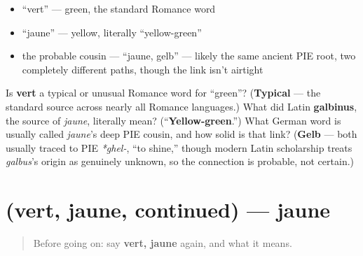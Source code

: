 \begin{itemize}
\raggedright
  \item \textquotedblleft{}vert\textquotedblright{} — green, the standard Romance word
  \item \textquotedblleft{}jaune\textquotedblright{} — yellow, literally \textquotedblleft{}yellow-green\textquotedblright{}
  \item the probable cousin — \textquotedblleft{}jaune, gelb\textquotedblright{} — likely the same ancient PIE root, two completely different paths, though the link isn't airtight
\end{itemize}

\begin{tcolorbox}[breakable,colback=teal!4,colframe=teal!35!black,title={Before you move on}]
Is \textbf{vert} a typical or unusual Romance word for \textquotedblleft{}green\textquotedblright{}? (\textbf{Typical} — the standard source across nearly all Romance languages.) What did Latin \textbf{galbinus}, the source of \emph{jaune}, literally mean? (\textquotedblleft{}\textbf{Yellow-green}.\textquotedblright{}) What German word is usually called \emph{jaune}'s deep PIE cousin, and how solid is that link? (\textbf{Gelb} — both usually traced to PIE \emph{*ghel-}, \textquotedblleft{}to shine,\textquotedblright{} though modern Latin scholarship treats \emph{galbus}'s origin as genuinely unknown, so the connection is probable, not certain.)
\end{tcolorbox}
\section[(vert, jaune, continued)]{(vert, jaune, continued) — jaune}

\label{lesson:FR-C23-vert-jaune-more}



\begin{quote}
Before going on: say \textbf{vert, jaune} again, and what it means.
\end{quote}

